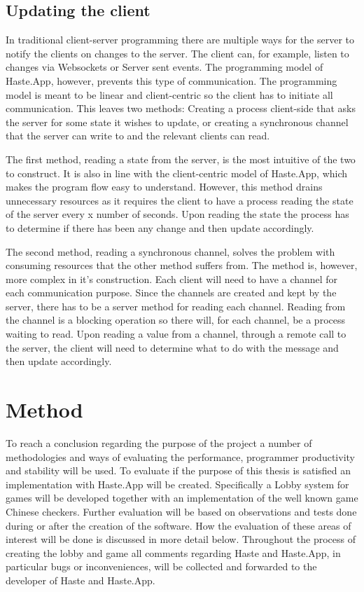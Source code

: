 \documentclass[a4paper]{article}
\begin{document}
\subsection{Updating the client}
\label{sub:updating-client}
In traditional client-server programming there are multiple ways for the server to notify the clients on changes to the server. The client can, for example, listen to changes via Websockets or Server sent events. The programming model of Haste.App, however, prevents this type of communication. The programming model is meant to be linear and client-centric so the client has to initiate all communication. This leaves two methods: Creating a process client-side that asks the server for some state it wishes to update, or creating a synchronous channel that the server can write to and the relevant clients can read.

The first method, reading a state from the server, is the most intuitive of the two to construct. It is also in line with the client-centric model of Haste.App, which makes the program flow easy to understand. However, this method drains unnecessary resources as it requires the client to have a process reading the state of the server every x number of seconds. Upon reading the state the process has to determine if there has been any change and then update accordingly.

The second method, reading a synchronous channel, solves the problem with consuming resources that the other method suffers from. The method is, however, more complex in it's construction. Each client will need to have a channel for each communication purpose. Since the channels are created and kept by the server, there has to be a server method for reading each channel. Reading from the channel is a blocking operation so there will, for each channel, be a process waiting to read. Upon reading a value from a channel, through a remote call to the server, the client will need to determine what to do with the message and then update accordingly.


\section{Method}
\label{sec:method}
To reach a conclusion regarding the purpose of the project a number of methodologies and ways of evaluating the performance, programmer productivity and stability will be used. To evaluate if the purpose of this thesis is satisfied an implementation with Haste.App will be created. Specifically a Lobby system for games will be developed together with an implementation of the well known game Chinese checkers. Further evaluation will be based on observations and tests done during or after the creation of the software. How the evaluation of these areas of interest will be done is discussed in more detail below. Throughout the process of creating the lobby and game all comments regarding Haste and Haste.App, in particular bugs or inconveniences, will be collected and forwarded to the developer of Haste and Haste.App.
\end{document}
